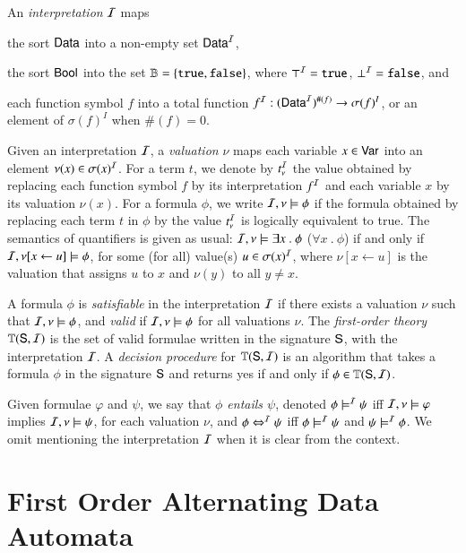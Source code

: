 \documentclass{llncs}
\begin{document}
An \emph{interpretation} $\mathcal{I}$ maps\begin{inparaenum}[(1)]
\item the sort $\mathsf{Data}$ into a non-empty set $\mathsf{Data}^{\mathcal{I}}$, 
%
\item the sort $\mathsf{Bool}$ into the set $\mathbb{B} = \left\{ \mathtt{true},\mathtt{false} \right\}$, where
  $\top^{\mathcal{I}} = \mathtt{true}$, $\bot^{\mathcal{I}} = \mathtt{false}$, and
%
\item each function symbol $f$ into a total function $f^{\mathcal{I}} :
  (\mathsf{Data}^{\mathcal{I}})^{\#(f)} \rightarrow \sigma(f)^I$, or an element of
  $\sigma(f)^I$ when $\#(f)=0$.
\end{inparaenum}
Given an interpretation $\mathcal{I}$, a \emph{valuation} $\nu$ maps each
variable $x \in \mathsf{Var}$ into an element $\nu(x) \in \sigma(x)^{\mathcal{I}}$. For
a term $t$, we denote by $t^{\mathcal{I}}_\nu$ the value obtained by replacing
each function symbol $f$ by its interpretation $f^{\mathcal{I}}$ and each
variable $x$ by its valuation $\nu(x)$. For a formula $\phi$, we write
$\mathcal{I},\nu \models \phi$ if the formula obtained by replacing each term
$t$ in $\phi$ by the value $t^{\mathcal{I}}_\nu$ is logically equivalent to true.
The semantics of quantifiers is given as usual: $\mathcal{I},\nu \models
\exists x ~.~ \phi$ ($\forall x ~.~ \phi$) if and only if $\mathcal{I},\nu[x
  \leftarrow u] \models \phi$, for some (for all) value(s) $u \in
\sigma(x)^{\mathcal{I}}$, where $\nu[x \leftarrow u]$ is the valuation that
assigns $u$ to $x$ and $\nu(y)$ to all $y \neq x$.

A formula $\phi$ is \emph{satisfiable} in the interpretation $\mathcal{I}$ if
there exists a valuation $\nu$ such that $\mathcal{I},\nu \models \phi$, and
\emph{valid} if $\mathcal{I},\nu \models \phi$ for all valuations $\nu$.  The
\emph{first-order theory} $\mathbb{T}(\mathsf{S},\mathcal{I})$ is the set of valid
formulae written in the signature $\mathsf{S}$, with the interpretation
$\mathcal{I}$. A \emph{decision procedure} for $\mathbb{T}(\mathsf{S},\mathcal{I})$ is an
algorithm that takes a formula $\phi$ in the signature $\mathsf{S}$ and
returns yes if and only if $\phi \in \mathbb{T}(\mathsf{S},\mathcal{I})$.

Given formulae $\varphi$ and $\psi$, we say that \emph{$\phi$ entails
  $\psi$}, denoted $\phi \models^{\mathcal{I}} \psi$ iff $\mathcal{I},\nu \models \varphi$
implies $\mathcal{I},\nu \models \psi$, for each valuation $\nu$, and $\phi
\Leftrightarrow^{\mathcal{I}} \psi$ iff $\phi \models^{\mathcal{I}} \psi$ and $\psi \models^{\mathcal{I}} \phi$.
We omit mentioning the interpretation $\mathcal{I}$ when it is clear from the
context.

\section{First Order Alternating Data Automata}
\end{document}
